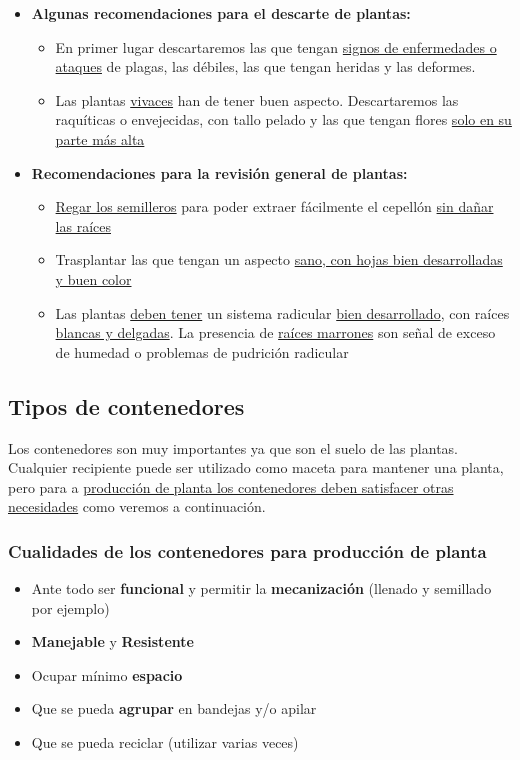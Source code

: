 \documentclass[a4paper,12pt,oneside]{article}
\begin{document}
\begin{itemize}
\item \textbf{Algunas recomendaciones para el descarte de plantas:}
\begin{itemize}
\item En primer lugar descartaremos las que tengan \uline{signos de enfermedades o ataques}
de plagas, las débiles, las que tengan heridas y las deformes.
\item Las plantas \uline{vivaces} han de tener buen aspecto. Descartaremos las raquíticas
o envejecidas, con tallo pelado y las que tengan flores \uline{solo en su parte más
alta}
\end{itemize}

\item \textbf{Recomendaciones para la revisión general de plantas:}
\begin{itemize}
\item \uline{Regar los semilleros} para poder extraer fácilmente el cepellón \uline{sin dañar
las raíces}
\item Trasplantar las que tengan un aspecto \uline{sano, con hojas bien desarrolladas
y buen color}
\item Las plantas \uline{deben tener} un sistema radicular \uline{bien desarrollado}, con
raíces \uline{blancas y delgadas}. La presencia de \uline{raíces marrones} son señal de
exceso de humedad o problemas de pudrición radicular
\end{itemize}
\end{itemize}

\subsection{Tipos de contenedores}
\label{sec:orge3a59d1}
Los contenedores son muy importantes ya que son el suelo de las
plantas. Cualquier recipiente puede ser utilizado como maceta para mantener una
planta, pero para a \uline{producción de planta los contenedores deben satisfacer
otras necesidades} como veremos a continuación.
\subsubsection{Cualidades de los contenedores para producción de planta}
\label{sec:orgec10f2a}
\begin{itemize}
\item Ante todo ser \textbf{funcional} y permitir la \textbf{mecanización} (llenado y semillado
por ejemplo)
\item \textbf{Manejable} y \textbf{Resistente}
\item Ocupar mínimo \textbf{espacio}
\item Que se pueda \textbf{agrupar} en bandejas y/o apilar
\item Que se pueda reciclar (utilizar varias veces)
\end{itemize}
\end{document}
